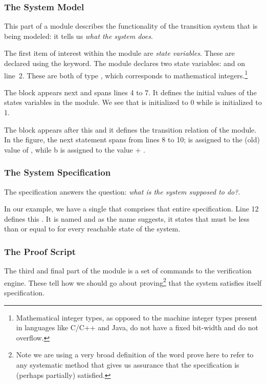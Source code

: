 \subsubsection{The System Model}
This part of a \uclid{} module describes the functionality of the transition system that is being modeled: it tells us \emph{what the system does}.

The first item of interest within the module  are \emph{state variables}. These are declared using the  keyword. The module  declares two state variables:  and  on line~2. These are both of type , which corresponds to mathematical integers.\footnote{Mathematical integer types, as opposed to the machine integer types present in languages like C/C++ and Java, do not have a fixed bit-width and do not overflow.}

The  block appears next and spans lines 4 to 7. It defines the initial values of the states variables in the module. We see that  is initialized to 0 while  is initialized to 1.

The  block appears after this and it defines the transition relation of the module. In the figure, the next statement spans from lines 8 to 10;  is assigned to the (old) value of , while b is assigned to the value  + .

\subsubsection{The System Specification}
The specification answers the question: \emph{what is the system supposed to do?}. 

In our example, we have a single  that comprises that entire specification. Line 12 defines this . It is named  and as the name suggests, it states that  must be less than or equal to  for every reachable state of the system.

\subsubsection{The Proof Script}
The third and final part of the \uclid{} module is a set of commands to the \uclid{} verification engine. These tell how we should go about proving\footnote{Note we are using a very broad definition of the word prove here to refer to any systematic method that gives us assurance that the specification is (perhaps partially) satisfied.} that the system satisfies itself specification.

